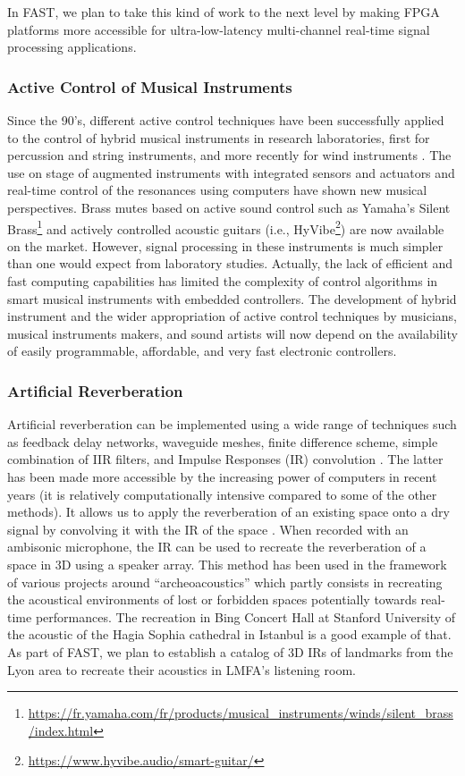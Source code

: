 \documentclass[a4paper,9pt]{extarticle}
\newcommand{\PP}{FAST}
\begin{document}
In \PP{}, we plan to take this kind of work to the next level by making FPGA platforms more accessible for ultra-low-latency multi-channel real-time signal processing applications.

\subsubsection{Active Control of Musical Instruments}

Since the 90's, different active control techniques have been successfully applied to the control of hybrid musical instruments in research laboratories, first for percussion and string instruments, and more recently for wind instruments \cite{Benachio-2016,Boutin-2001,meurisse2015experimental,Meurisse2015-Mute}. The use on stage of augmented instruments with integrated sensors and actuators and real-time control of the resonances using computers have shown new musical perspectives.
Brass mutes based on active sound control such as Yamaha's Silent Brass\footnote{\url{https://fr.yamaha.com/fr/products/musical\_instruments/winds/silent_brass/index.html}} and actively controlled acoustic guitars (i.e., HyVibe\footnote{\url{https://www.hyvibe.audio/smart-guitar/}}) are now available on the market.
However, signal processing in these instruments is much simpler than one would expect from laboratory studies. Actually, the lack of efficient and fast computing capabilities has limited the complexity of control algorithms in smart musical instruments with embedded controllers. The development of hybrid instrument and the wider appropriation of active control techniques by musicians, musical instruments makers, and sound artists will now depend on the availability of easily programmable, affordable, and very fast electronic controllers.

\subsubsection{Artificial Reverberation}

Artificial reverberation can be implemented using a wide range of techniques such as feedback delay networks, waveguide meshes, finite difference scheme, simple combination of IIR filters, and Impulse Responses (IR) convolution \cite{valimaki2012fifty}. The latter has been made more accessible by the increasing power of computers in recent years (it is relatively computationally intensive compared to some of the other methods). It allows us to apply the reverberation of an existing space onto a dry signal by convolving it with the IR of the space \cite{reilly1995convolution}. When recorded with an ambisonic microphone, the IR can be used to recreate the reverberation of a space in 3D using a speaker array. This method has been used in the framework of various projects around ``archeoacoustics'' which partly consists in recreating the acoustical environments of lost or forbidden spaces potentially towards real-time performances. The recreation in Bing Concert Hall at Stanford University of the acoustic of the Hagia Sophia cathedral in Istanbul \cite{Abel2009} is a good example of that. As part of \PP{}, we plan to establish a catalog of 3D IRs of landmarks from the Lyon area to recreate their acoustics in LMFA's listening room.  
\end{document}
